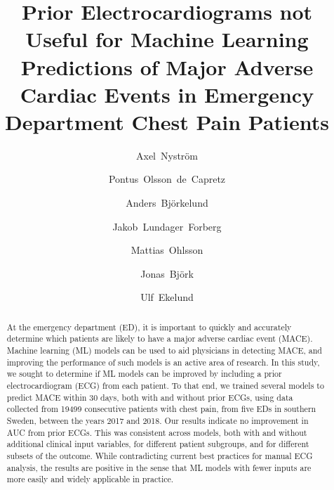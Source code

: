 \documentclass[preprint]{elsarticle}
\begin{document}
\begin{frontmatter}

\title{Prior Electrocardiograms not Useful for Machine Learning Predictions of Major Adverse Cardiac Events in Emergency Department Chest Pain Patients}

\author[inst1]{Axel~Nystr\"{o}m}
\author[inst2,inst3]{Pontus~Olsson~de~Capretz}
\author[inst4]{Anders~Bj\"{o}rkelund}
\author[inst3,inst5]{Jakob~Lundager~Forberg}
\author[inst4,inst6]{Mattias~Ohlsson}
\author[inst1,inst7]{Jonas~Bj\"{o}rk}
\author[inst2,inst3]{Ulf~Ekelund}


            







\begin{abstract}
At the emergency department (ED), it is important to quickly and accurately determine which patients are likely to have a major adverse cardiac event (MACE). Machine learning (ML) models can be used to aid physicians in detecting MACE, and improving the performance of such models is an active area of research. In this study, we sought to determine if ML models can be improved by including a prior electrocardiogram (ECG) from each patient. To that end, we trained several models to predict MACE within 30 days, both with and without prior ECGs, using data collected from 19499 consecutive patients with chest pain, from five EDs in southern Sweden, between the years 2017 and 2018. Our results indicate no improvement in AUC from prior ECGs. This was consistent across models, both with and without additional clinical input variables, for different patient subgroups, and for different subsets of the outcome. While contradicting current best practices for manual ECG analysis, the results are positive in the sense that ML models with fewer inputs are more easily and widely applicable in practice.
\end{abstract}


\end{frontmatter}
\end{document}
